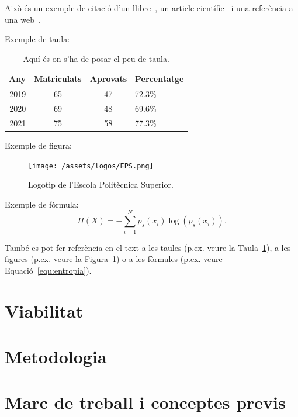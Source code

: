 \documentclass[a4paper,12pt]{ThesisStyle}
\begin{document}
Això és un exemple de citació d'un llibre~\cite{Coleman1974}, un article científic~\cite{Ruiz2008} i una referència a una web~\cite{Halcon}.

Exemple de taula:
\begin{table}[htb]
  \centering
  \begin{tabular}{ | r | c | c | l | }
    \hline
    Any  & Matriculats & Aprovats & Percentatge \\
    \hline
    2019 & 65          & 47       & 72.3\%      \\
    2020 & 69          & 48       & 69.6\%      \\
    2021 & 75          & 58       & 77.3\%      \\
    \hline
  \end{tabular}
  \caption{\label{taula:taulaexemple} Aquí és on s'ha de posar el peu de taula. }
\end{table}

Exemple de figura:
\begin{figure}[htb]
  \centering
  \texttt{[image: /assets/logos/EPS.png]}
  \caption{\label{fig:logo} Logotip de l'Escola Politècnica Superior.}
\end{figure}

Exemple de fòrmula:
\begin{equation}
  H(X) = -\sum_{i=1}^{N}p_s(x_i) \log \left( p_s(x_i) \right).
  \label{equ:entropia}
\end{equation}


També es pot fer referència en el text a les taules (p.ex. veure la Taula~\ref{taula:taulaexemple}), a les figures (p.ex. veure la Figura~\ref{fig:logo}) o a les fòrmules (p.ex. veure Equació~\ref{equ:entropia}).



\chapter{Viabilitat}
\label{cap:viabilitat}



\chapter{Metodologia}
\label{cap:metodologia}



\chapter{Marc de treball i conceptes previs}  %
\label{cap:marcdetreball}
\end{document}
